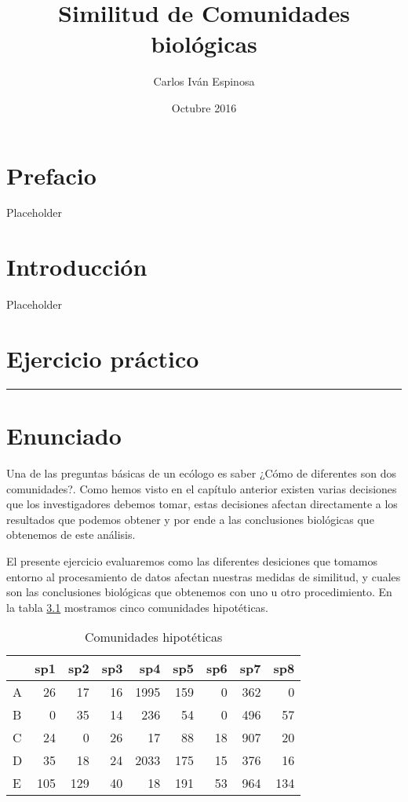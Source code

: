 \documentclass[]{book}
\title{Similitud de Comunidades biológicas}
\author{Carlos Iván Espinosa}
\date{Octubre 2016}
\begin{document}
\maketitle

{
\setcounter{tocdepth}{1}
\tableofcontents
}
\chapter*{Prefacio}\label{prefacio}

Placeholder

\chapter{Introducción}\label{introduccion}

Placeholder

\chapter{Ejercicio práctico}\label{ejercicio-practico}

\begin{center}\rule{0.5\linewidth}{\linethickness}\end{center}

\chapter{Enunciado}\label{enunciado}

Una de las preguntas básicas de un ecólogo es saber ¿Cómo de diferentes
son dos comunidades?. Como hemos visto en el capítulo anterior existen
varias decisiones que los investigadores debemos tomar, estas decisiones
afectan directamente a los resultados que podemos obtener y por ende a
las conclusiones biológicas que obtenemos de este análisis.

El presente ejercicio evaluaremos como las diferentes desiciones que
tomamos entorno al procesamiento de datos afectan nuestras medidas de
similitud, y cuales son las conclusiones biológicas que obtenemos con
uno u otro procedimiento. En la tabla \ref{tab:ejer1} mostramos cinco
comunidades hipotéticas.

\begin{table}

\caption{\label{tab:ejer1}Comunidades hipotéticas}
\centering
\begin{tabular}[t]{lrrrrrrrr}
\toprule
  & sp1 & sp2 & sp3 & sp4 & sp5 & sp6 & sp7 & sp8\\
\midrule
A & 26 & 17 & 16 & 1995 & 159 & 0 & 362 & 0\\
B & 0 & 35 & 14 & 236 & 54 & 0 & 496 & 57\\
C & 24 & 0 & 26 & 17 & 88 & 18 & 907 & 20\\
D & 35 & 18 & 24 & 2033 & 175 & 15 & 376 & 16\\
E & 105 & 129 & 40 & 18 & 191 & 53 & 964 & 134\\
\bottomrule
\end{tabular}
\end{table}
\end{document}
